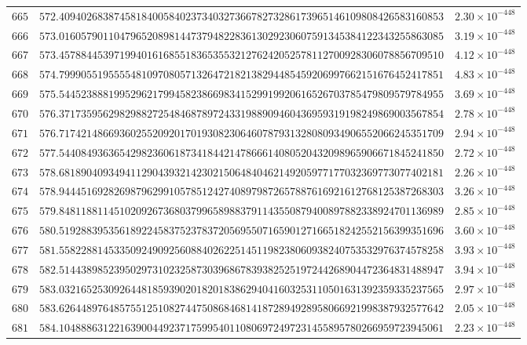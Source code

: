\documentclass[12pt,reqno]{amsart}
\theoremstyle{remark}
\begin{document}
\begin{longtable}{clc}
$665$ & $572.4094026838745818400584023734032736678273286173965146109808426583160853$ & $2.30\times 10^{-448}$ \\
$666$ & $573.0160579011047965208981447379482283613029230607591345384122343255863085$ & $3.19\times 10^{-448}$ \\
$667$ & $573.4578844539719940161685518365355321276242052578112700928306078856709510$ & $4.12\times 10^{-448}$ \\
$668$ & $574.7999055195555481097080571326472182138294485459206997662151676452417851$ & $4.83\times 10^{-448}$ \\
$669$ & $575.5445238881995296217994582386698341529919920616526703785479809579784955$ & $3.69\times 10^{-448}$ \\
$670$ & $576.3717359562982988272548468789724331988909460436959319198249869003567854$ & $2.78\times 10^{-448}$ \\
$671$ & $576.7174214866936025520920170193082306460787931328080934906552066245351709$ & $2.94\times 10^{-448}$ \\
$672$ & $577.5440849363654298236061873418442147866614080520432098965906671845241850$ & $2.72\times 10^{-448}$ \\
$673$ & $578.6818904093494112904393214230215064840462149205977177032369773077402181$ & $2.26\times 10^{-448}$ \\
$674$ & $578.9444516928269879629910578512427408979872657887616921612768125387268303$ & $3.26\times 10^{-448}$ \\
$675$ & $579.8481188114510209267368037996589883791143550879400897882338924701136989$ & $2.85\times 10^{-448}$ \\
$676$ & $580.5192883953561892245837523783720569550716590127166518242552156399351696$ & $3.60\times 10^{-448}$ \\
$677$ & $581.5582288145335092490925608840262251451198238060938240753532976374578258$ & $3.93\times 10^{-448}$ \\
$678$ & $582.5144389852395029731023258730396867839382525197244268904472364831488947$ & $3.94\times 10^{-448}$ \\
$679$ & $583.0321652530926448185939020182018386294041603253110501631392359335237565$ & $2.97\times 10^{-448}$ \\
$680$ & $583.6264489764857551251082744750868468141872894928958066921998387932577642$ & $2.05\times 10^{-448}$ \\
$681$ & $584.1048886312216390044923717599540110806972497231455895780266959723945061$ & $2.23\times 10^{-448}$ \\

\end{longtable}
\end{document}
